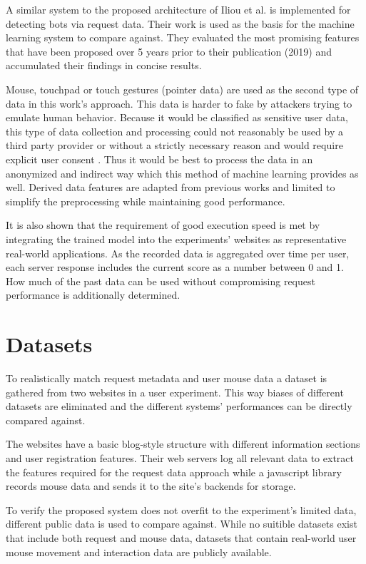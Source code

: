\documentclass[
    fontsize=12pt,
    headings=small,
    parskip=half,           %
    bibliography=totoc,
    numbers=noenddot,       %
    open=any,               %
    final,                   %
    table
]{scrreprt}
\begin{document}
A similar system to the proposed architecture of Iliou et al. \cite{10.1145/3339252.3339267} is implemented for detecting bots via request data. Their work is used as the basis for the machine learning system to compare against. They evaluated the most promising features that have been proposed over 5 years prior to their publication (2019) and accumulated their findings in concise results.

Mouse, touchpad or touch gestures (pointer data) are used as the second type of data in this work's approach. This data is harder to fake by attackers trying to emulate human behavior. Because it would be classified as sensitive user data, this type of data collection and processing could not reasonably be used by a third party provider or without a strictly necessary reason and would require explicit user consent \cite{GDPR}. Thus it would be best to process the data in an anonymized and indirect way which this method of machine learning provides as well. Derived data features are adapted from previous works and limited to simplify the preprocessing while maintaining good performance.

It is also shown that the requirement of good execution speed is met by integrating the trained model into the experiments' websites as representative real-world applications. As the recorded data is aggregated over time per user, each server response includes the current score as a number between 0 and 1. How much of the past data can be used without compromising request performance is additionally determined.

\section{Datasets}

To realistically match request metadata and user mouse data a dataset is gathered from two websites in a user experiment. This way biases of different datasets are eliminated and the different systems' performances can be directly compared against.

The websites have a basic blog-style structure with different information sections and user registration features. Their web servers log all relevant data to extract the features required for the request data approach while a javascript library records mouse data and sends it to the site's backends for storage.

To verify the proposed system does not overfit to the experiment's limited data, different public data is used to compare against. While no suitible datasets exist that include both request and mouse data, datasets that contain real-world user mouse movement and interaction data are publicly available.
\end{document}
